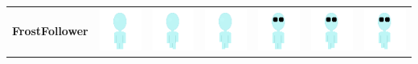 \documentclass[../Main.tex]{subfiles}
\begin{document}
\begin{center}
\begin{tabular}{ | m{} | m{} m{} m{} m{} m{} m{} | }
                    \multirow{2}{*}{\textbf{FrostFollower}} & \centerline{\includegraphics[scale=3]{../res/textures/entities/followers/frost/North.png}} & \centerline{\includegraphics[scale=3]{../res/textures/entities/followers/frost/North-Walk-1.png}} & \centerline{\includegraphics[scale=3]{../res/textures/entities/followers/frost/North-Walk-2.png}} & \centerline{\includegraphics[scale=3]{../res/textures/entities/followers/frost/South.png}} & \centerline{\includegraphics[scale=3]{../res/textures/entities/followers/frost/South-Walk-1.png}} & \centerline{\includegraphics[scale=3]{../res/textures/entities/followers/frost/South-Walk-2.png}} \\

\end{tabular}
\end{center}
\end{document}
